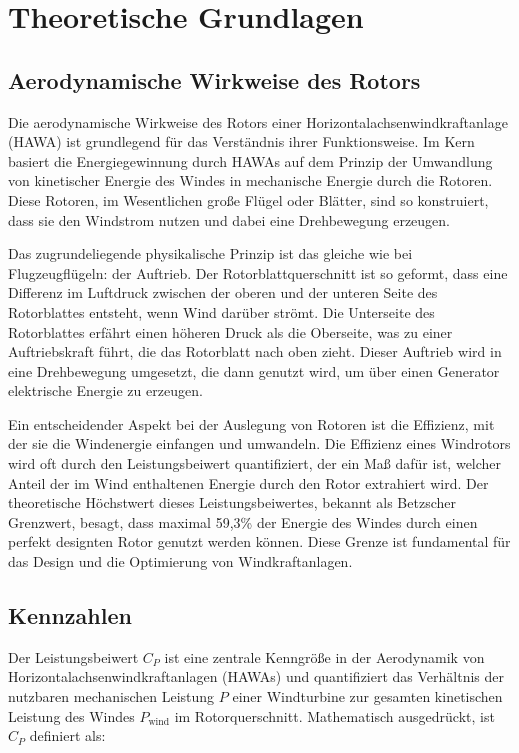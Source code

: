 \chapter{Theoretische Grundlagen}

\section{Aerodynamische Wirkweise des Rotors}
Die aerodynamische Wirkweise des Rotors einer Horizontalachsenwindkraftanlage (HAWA) ist grundlegend für das Verständnis ihrer Funktionsweise.
Im Kern basiert die Energiegewinnung durch HAWAs auf dem Prinzip der Umwandlung von kinetischer Energie des Windes in mechanische Energie durch die Rotoren.
Diese Rotoren, im Wesentlichen große Flügel oder Blätter, sind so konstruiert, dass sie den Windstrom nutzen und dabei eine Drehbewegung erzeugen.

Das zugrundeliegende physikalische Prinzip ist das gleiche wie bei Flugzeugflügeln: der Auftrieb.
Der Rotorblattquerschnitt ist so geformt, dass eine Differenz im Luftdruck zwischen der oberen und der unteren Seite des Rotorblattes entsteht, wenn Wind darüber strömt.
Die Unterseite des Rotorblattes erfährt einen höheren Druck als die Oberseite, was zu einer Auftriebskraft führt, die das Rotorblatt nach oben zieht.
Dieser Auftrieb wird in eine Drehbewegung umgesetzt, die dann genutzt wird, um über einen Generator elektrische Energie zu erzeugen.

Ein entscheidender Aspekt bei der Auslegung von Rotoren ist die Effizienz, mit der sie die Windenergie einfangen und umwandeln.
Die Effizienz eines Windrotors wird oft durch den Leistungsbeiwert quantifiziert, der ein Maß dafür ist, welcher Anteil der im Wind enthaltenen Energie durch den Rotor extrahiert wird.
Der theoretische Höchstwert dieses Leistungsbeiwertes, bekannt als Betzscher Grenzwert, besagt, dass maximal 59,3\% der Energie des Windes durch einen perfekt designten Rotor genutzt werden können.
Diese Grenze ist fundamental für das Design und die Optimierung von Windkraftanlagen.

\section{Kennzahlen}
Der Leistungsbeiwert \( C_P \) ist eine zentrale Kenngröße in der Aerodynamik von Horizontalachsenwindkraftanlagen (HAWAs) und quantifiziert das Verhältnis der nutzbaren mechanischen Leistung \( P \) einer Windturbine zur gesamten kinetischen Leistung des Windes \( P_{\text{wind}} \) im Rotorquerschnitt. Mathematisch ausgedrückt, ist \( C_P \) definiert als:

